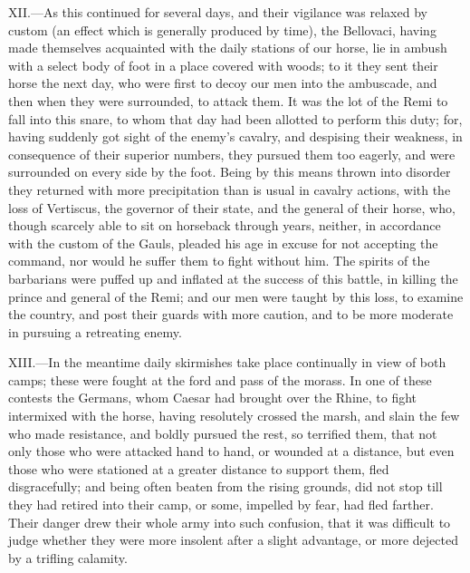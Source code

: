 XII.—As this continued for several days, and their vigilance was
relaxed by custom (an effect which is generally produced by time), the
Bellovaci, having made themselves acquainted with the daily stations of
our horse, lie in ambush with a select body of foot in a place covered
with woods; to it they sent their horse the next day, who were first to
decoy our men into the ambuscade, and then when they were surrounded, to
attack them. It was the lot of the Remi to fall into this snare, to whom
that day had been allotted to perform this duty; for, having suddenly
got sight of the enemy's cavalry, and despising their weakness, in
consequence of their superior numbers, they pursued them too eagerly,
and were surrounded on every side by the foot. Being by this means
thrown into disorder they returned with more precipitation than is usual
in cavalry actions, with the loss of Vertiscus, the governor of their
state, and the general of their horse, who, though scarcely able to sit
on horseback through years, neither, in accordance with the custom of
the Gauls, pleaded his age in excuse for not accepting the command, nor
would he suffer them to fight without him. The spirits of the barbarians
were puffed up and inflated at the success of this battle, in killing
the prince and general of the Remi; and our men were taught by this
loss, to examine the country, and post their guards with more caution,
and to be more moderate in pursuing a retreating enemy.

XIII.—In the meantime daily skirmishes take place continually in view
of both camps; these were fought at the ford and pass of the morass. In
one of these contests the Germans, whom Caesar had brought over the
Rhine, to fight intermixed with the horse, having resolutely crossed the
marsh, and slain the few who made resistance, and boldly pursued the
rest, so terrified them, that not only those who were attacked hand to
hand, or wounded at a distance, but even those who were stationed at a
greater distance to support them, fled disgracefully; and being often
beaten from the rising grounds, did not stop till they had retired into
their camp, or some, impelled by fear, had fled farther. Their danger
drew their whole army into such confusion, that it was difficult to
judge whether they were more insolent after a slight advantage, or more
dejected by a trifling calamity.

